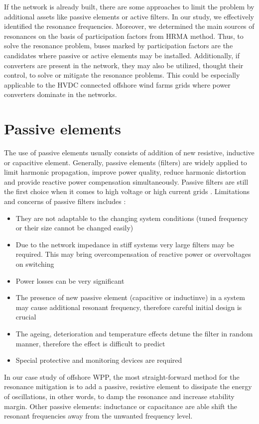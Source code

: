 \documentclass[a4paper,11pt,twoside]{report} %
\begin{document}
If the network is already built, there are some approaches to limit the problem by additional assets like passive elements or active filters. In our study, we effectively identified the resonance frequencies. Moreover, we determined the main sources of resonances on the basis of participation factors from HRMA method. Thus, to solve the resonance problem, buses marked by participation factors are the candidates where passive or active elements may be installed. Additionally, if converters are present in the network, they may also be utilized, thought their control, to solve or mitigate the resonance problems. This could be especially applicable to the HVDC connected offshore wind farms grids where power converters dominate in the networks.

\section{Passive elements}
The use of passive elements usually consists of addition of new resistive, inductive or capacitive element. Generally, passive elements (filters) are widely applied to limit harmonic propagation, improve power quality, reduce harmonic distortion and provide reactive power compensation simultaneously. Passive filters are still the first choice when it comes to high voltage or high current grids \cite{das}. Limitations and concerns of passive filters includes \cite{das}:
\begin{itemize}
	\item They are not adaptable to the changing system conditions (tuned frequency or their size cannot be changed easily)
	\item Due to the network impedance in stiff systems very large filters may be required. This may bring overcompensation of reactive power or overvoltages on switching
	\item Power losses can be very significant
	\item The presence of new passive element (capacitive or inductinve) in a system may cause additional resonant frequency, therefore careful initial design is crucial
	\item The ageing, deterioration and temperature effects detune the filter in random manner, therefore the effect is difficult to predict
	\item Special protective and monitoring devices are required
\end{itemize}

In our case study of offshore WPP, the most straight-forward method for the resonance mitigation is to add a passive, resistive element to dissipate the energy of oscillations, in other words, to damp the resonance and increase stability margin. Other passive elements: inductance or capacitance are able shift the resonant frequencies away from the unwanted frequency level.
\end{document}
